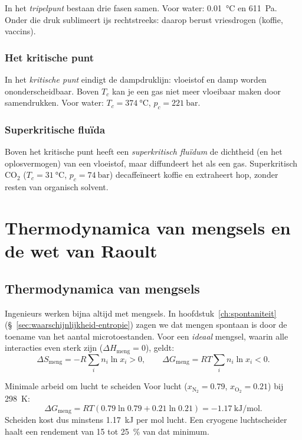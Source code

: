 In het \emph{tripelpunt} bestaan drie fasen samen. Voor water: \SI{0.01}{\celsius} en \SI{611}{\pascal}. Onder die druk sublimeert ijs rechtstreeks: daarop berust vriesdrogen (koffie, vaccins).

\subsubsection{Het kritische punt}
\label{sec:kritisch-punt}

In het \emph{kritische punt} eindigt de dampdruklijn: vloeistof en damp worden ononderscheidbaar. Boven $T_c$ kan je een gas niet meer vloeibaar maken door samendrukken. Voor water: $T_c = \SI{374}{\celsius}$, $p_c = \SI{221}{\bar}$.

\subsubsection{Superkritische flu\"ida}
\label{sec:superkritisch}

Boven het kritische punt heeft een \emph{superkritisch flu\"idum} de dichtheid (en het oplosvermogen) van een vloeistof, maar diffundeert het als een gas. Superkritisch $\mathrm{CO_2}$ ($T_c = \SI{31}{\celsius}$, $p_c = \SI{74}{\bar}$) decaffe\"ineert koffie en extraheert hop, zonder resten van organisch solvent.

\section{Thermodynamica van mengsels en de wet van Raoult}

\subsection{Thermodynamica van mengsels}
\label{sec:thermodynamica-mengsels}

Ingenieurs werken bijna altijd met mengsels. In hoofdstuk~\ref{ch:spontaniteit} (\S~\ref{sec:waarschijnlijkheid-entropie}) zagen we dat mengen spontaan is door de toename van het aantal microtoestanden. Voor een \emph{ideaal} mengsel, waarin alle interacties even sterk zijn ($\Delta H_{\text{meng}} = 0$), geldt:
\begin{equation}
\Delta S_{\text{meng}} = -R \sum_i n_i \ln x_i > 0,
\qquad
\Delta G_{\text{meng}} = RT \sum_i n_i \ln x_i < 0.
\end{equation}

\begin{voorbeeld}{Minimale arbeid om lucht te scheiden}
Voor lucht ($x_{\mathrm{N_2}} = 0.79$, $x_{\mathrm{O_2}} = 0.21$) bij \SI{298}{\kelvin}:
\[
\Delta G_{\text{meng}} = RT(0.79\ln 0.79 + 0.21\ln 0.21) = \SI{-1.17}{\kilo\joule\per\mole}.
\]
Scheiden kost dus minstens \SI{1.17}{\kilo\joule} per mol lucht. Een cryogene luchtscheider haalt een rendement van 15 tot \SI{25}{\percent} van dat minimum.
\end{voorbeeld}


